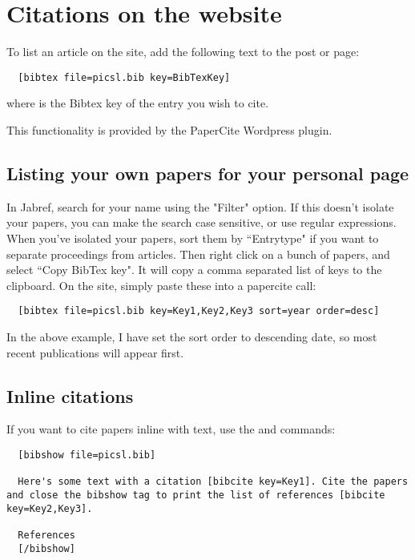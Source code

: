 \documentclass{InsightArticle}
\begin{document}
\section{Citations on the website}

To list an article on the site, add the following text to the post or page:
\begin{lstlisting}
  [bibtex file=picsl.bib key=BibTexKey]
\end{lstlisting}
where  is the Bibtex key of the entry you wish to cite. 

This functionality is provided by the PaperCite Wordpress plugin. 

\subsection{Listing your own papers for your personal page}

In Jabref, search for your name using the "Filter" option. If this doesn't isolate your papers, you can make the search case sensitive, or use regular expressions. When you've isolated your papers, sort them by ``Entrytype" if you want to separate proceedings from articles. Then right click on a bunch of papers, and select ``Copy BibTex key". It will copy a comma separated list of keys to the clipboard. On the site, simply paste these into a papercite call:
\begin{lstlisting}
  [bibtex file=picsl.bib key=Key1,Key2,Key3 sort=year order=desc]
\end{lstlisting}

In the above example, I have set the sort order to descending date, so most recent publications will appear first.


\subsection{Inline citations}

If you want to cite papers inline with text, use the  and  commands:
\begin{lstlisting}
  [bibshow file=picsl.bib]
 
  Here's some text with a citation [bibcite key=Key1]. Cite the papers and close the bibshow tag to print the list of references [bibcite key=Key2,Key3].
  
  References
  [/bibshow]
\end{lstlisting}




\end{document}
